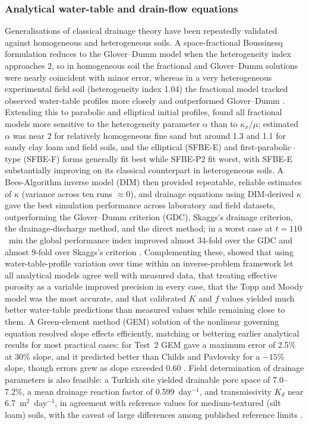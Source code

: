 \documentclass[11pt]{article}
\begin{document}
\subsubsection{Analytical water-table and drain-flow equations}

Generalisations of classical drainage theory have been repeatedly validated
against homogeneous and heterogeneous soils. A space-fractional Boussinesq
formulation reduces to the Glover--Dumm model when the heterogeneity index
approaches 2, so in homogeneous soil the fractional and Glover--Dumm solutions
were nearly coincident with minor error, whereas in a very heterogeneous
experimental field soil (heterogeneity index 1.04) the fractional model tracked
observed water-table profiles more closely and outperformed Glover--Dumm
\parencite{Mehdinejadiani2013}. Extending this to parabolic and elliptical
initial profiles, \textcite{Mehdinejadiani2020} found all fractional models more
sensitive to the heterogeneity parameter $\alpha$ than to $\kappa_x/\mu$;
estimated $\alpha$ was near 2 for relatively homogeneous fine sand but around
1.3 and 1.1 for sandy clay loam and field soils, and the elliptical (SFBE-E) and
first-parabolic--type (SFBE-F) forms generally fit best while SFBE-P2 fit worst,
with SFBE-E substantially improving on its classical counterpart in
heterogeneous soils. A Bees-Algorithm inverse model (DIM) then provided
repeatable, reliable estimates of $\kappa$ (variance across ten runs
$\approx0$), and drainage equations using DIM-derived $\kappa$ gave the best
simulation performance across laboratory and field datasets, outperforming the
Glover--Dumm criterion (GDC), Skaggs's drainage criterion, the drainage-discharge
method, and the direct method; in a worst case at $t=110$~min the global
performance index improved almost 34-fold over the GDC and almost 9-fold over
Skaggs's criterion \parencite{Mehdinejadiani2022}. Complementing these,
\textcite{Samani2007} showed that using water-table-profile variation over time
within an inverse-problem framework let all analytical models agree well with
measured data, that treating effective porosity as a variable improved precision
in every case, that the Topp and Moody model was the most accurate, and that
calibrated $K$ and $f$ values yielded much better water-table predictions than
measured values while remaining close to them. A Green-element method (GEM)
solution of the nonlinear governing equation resolved slope effects efficiently,
matching or bettering earlier analytical results for most practical cases: for
Test~2 GEM gave a maximum error of 2.5\% at 30\% slope, and it predicted better
than Childs and Pavlovsky for a $-15$\% slope, though errors grew as slope
exceeded 0.60 \parencite{Onyejekwe1999}. Field determination of drainage
parameters is also feasible: a Turkish site yielded drainable pore space of
7.0--7.2\%, a mean drainage reaction factor of 0.599~day$^{-1}$, and
transmissivity $K_d$ near 6.7~m$^2$~day$^{-1}$, in agreement with reference
values for medium-textured (silt loam) soils, with the caveat of large
differences among published reference limits \parencite{Bahceci2008}.
\end{document}
